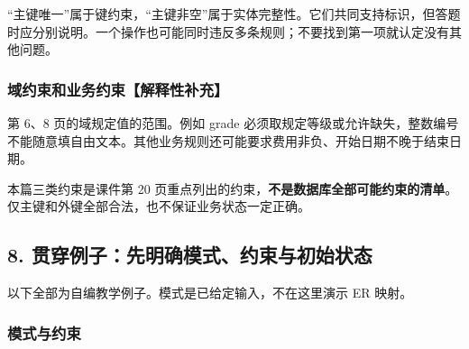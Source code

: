 ``主键唯一''属于键约束，``主键非空''属于实体完整性。它们共同支持标识，但答题时应分别说明。一个操作也可能同时违反多条规则；不要找到第一项就认定没有其他问题。

\subsubsection{域约束和业务约束【解释性补充】}\label{03_relational_model_and_integrity_zh-ux57dfux7ea6ux675fux548cux4e1aux52a1ux7ea6ux675fux89e3ux91caux6027ux8865ux5145}

第 6、8 页的域规定值的范围。例如 grade 必须取规定等级或允许缺失，整数编号不能随意填自由文本。其他业务规则还可能要求费用非负、开始日期不晚于结束日期。

本篇三类约束是课件第 20 页重点列出的约束，\textbf{不是数据库全部可能约束的清单}。仅主键和外键全部合法，也不保证业务状态一定正确。

\subsection{8. 贯穿例子：先明确模式、约束与初始状态}\label{03_relational_model_and_integrity_zh-ux8d2fux7a7fux4f8bux5b50ux5148ux660eux786eux6a21ux5f0fux7ea6ux675fux4e0eux521dux59cbux72b6ux6001}

以下全部为自编教学例子。模式是已给定输入，不在这里演示 ER 映射。

\subsubsection{模式与约束}\label{03_relational_model_and_integrity_zh-ux6a21ux5f0fux4e0eux7ea6ux675f}


